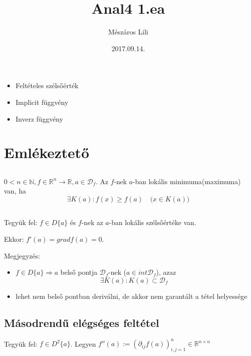\documentclass[a4paper,11.5pt]{article}
\title{Anal4 1.ea}
\date{2017.09.14.}
\author{Mészáros Lili}
\begin{document}
    \maketitle
    \setlength{\unitlength}{5cm}

\begin{itemize}
    \item Feltételes szélsőérték
    \item Implicit függvény
    \item Inverz függvény
\end{itemize}
\section{Emlékeztető}
\subsection{}
    $0<n\in\mathbb{N}, f\in\mathbb{R}^{n}\rightarrow\mathbb{R}, a\in\mathcal{D}_{f}$. Az $f$-nek $a$-ban lokális minimuma(maximuma) van, ha
    \begin{equation*}
        \exists K(a): f(x)\geq f(a)\quad \big(x\in K(a)\big)
    \end{equation*}

    \subsection{}
    Tegyük fel: $f\in D\{a\}$ és $f$-nek az $a$-ban lokális szélsőértéke van.

Ekkor: $f'(a)=grad f(a)=0$.

    Megjegyzés:
    \begin{itemize}
        \item $f\in D\{a\}\Rightarrow a$ belső pontja $\mathcal{D}_{f}$-nek ($a\in int\mathcal{D}_{f}$), azaz
        \begin{equation*}
            \exists K(a): K(a)\subset\mathcal{D}_{f}
        \end{equation*}
        \item lehet nem belső pontban deriválni, de akkor nem garantált a tétel helyessége
    \end{itemize}
    \subsection{Másodrendű elégséges feltétel}
    Tegyük fel: $f\in D^2\{a\}$. Legyen $f''(a):=(\partial_{ij}f(a))_{i,j=1}^{n}\in\mathbb{R}^{n\times n}$
\end{document}
